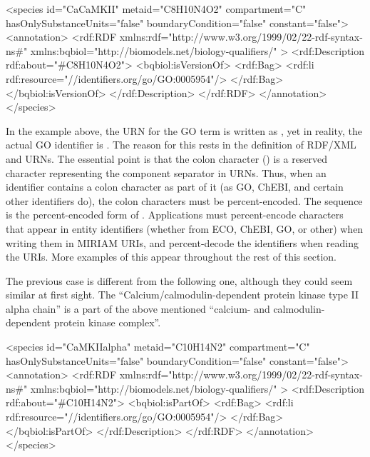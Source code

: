 \begin{example}
<species id="CaCaMKII" metaid="C8H10N4O2" compartment="C"
         hasOnlySubstanceUnits="false" boundaryCondition="false"
         constant="false">
  <annotation>
    <rdf:RDF
      xmlns:rdf="http://www.w3.org/1999/02/22-rdf-syntax-ns\#"
      xmlns:bqbiol="http://biomodels.net/biology-qualifiers/"
    >
      <rdf:Description rdf:about="\#C8H10N4O2">
        <bqbiol:isVersionOf>
          <rdf:Bag>
            <rdf:li rdf:resource="//identifiers.org/go/GO:0005954\!"/>
          </rdf:Bag>
        </bqbiol:isVersionOf>
      </rdf:Description>
    </rdf:RDF>
  </annotation>
</species>
\end{example}

In the example above, the URN for the GO term is written as
, yet in reality, the actual GO identifier is
.  The reason for this rests in the definition
of RDF/XML and URNs.  The essential point is that the colon
character (\val{:}) is a reserved character representing the
component separator in URNs.  Thus, when an identifier contains a
colon character as part of it (as GO, ChEBI, and certain other
identifiers do), the colon characters must be percent-encoded.
The sequence  is the percent-encoded form of \val{:}.
Applications must percent-encode \val{:} characters that appear in
entity identifiers (whether from ECO, ChEBI, GO, or other) when
writing them in MIRIAM URIs, and percent-decode the identifiers
when reading the URIs.  More examples of this appear throughout
the rest of this section.

The previous case is different from the following one, although they
could seem similar at first sight. The
``Calcium/calmodulin-dependent protein kinase type II alpha
chain'' is a part of the above mentioned ``calcium- and
calmodulin-dependent protein kinase complex''.

\begin{example}
<species id="CaMKIIalpha" metaid="C10H14N2" compartment="C"
         hasOnlySubstanceUnits="false" boundaryCondition="false"
         constant="false">
  <annotation>
    <rdf:RDF
      xmlns:rdf="http://www.w3.org/1999/02/22-rdf-syntax-ns\#"
      xmlns:bqbiol="http://biomodels.net/biology-qualifiers/"
    >
      <rdf:Description rdf:about="\#C10H14N2">
        <bqbiol:isPartOf>
          <rdf:Bag>
            <rdf:li rdf:resource="//identifiers.org/go/GO:0005954\!"/>
          </rdf:Bag>
        </bqbiol:isPartOf>
      </rdf:Description>
    </rdf:RDF>
  </annotation>
</species>
\end{example}

